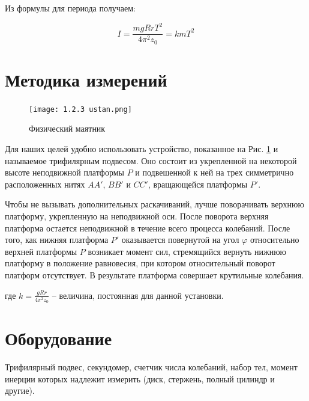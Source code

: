 \documentclass[a4, 12pt]{article}
\begin{document}
	Из формулы для периода получаем:

	\begin{equation}\label{momin}
		I = \frac{mgRrT^2}{4 \pi^2z_0} = kmT^2
	\end{equation}

	\section {Методика измерений}

	\begin{figure}
		\texttt{[image: 1.2.3 ustan.png]}
		\caption{Физический маятник}\label{risunok}
	\end{figure}

	Для наших целей удобно использовать устройство, показанное на Рис. \ref{risunok} и называемое трифилярным подвесом. Оно состоит из укрепленной на некоторой высоте неподвижной платформы $P$ и подвешенной к ней на трех симметрично расположенных нитях $AA'$, $BB'$ и $CC'$, вращающейся платформы $P'$.

	Чтобы не вызывать дополнительных раскачиваний, лучше поворачивать верхнюю платформу, укрепленную на неподвижной оси. После поворота верхняя платформа остается неподвижной в течение всего процесса колебаний. После того, как нижняя платформа $P'$ оказывается повернутой на угол $\varphi$ относительно верхней платформы $P$ возникает момент сил, стремящийся вернуть нижнюю платформу в положение равновесия, при котором относительный поворот платформ отсутствует. В результате платформа совершает крутильные колебания.

	\noindent где $k = \frac{gRr}{4\pi^2z_0}$ -- величина, постоянная для данной установки.

	\section{Оборудование}
	Трифилярный подвес, секундомер, счетчик числа колебаний, набор тел, момент инерции которых надлежит измерить (диск, стержень, полный цилиндр и другие).
\end{document}
